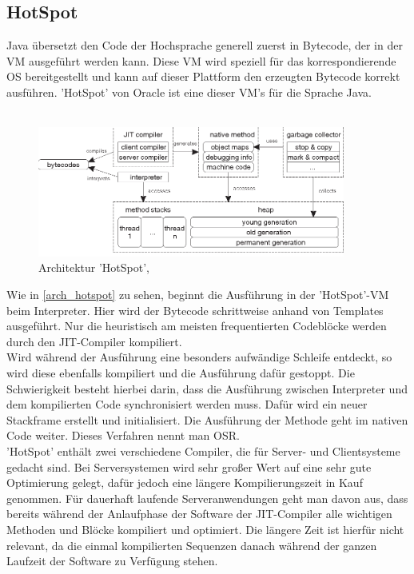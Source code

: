 \subsection{HotSpot}
Java übersetzt den Code der Hochsprache generell zuerst in Bytecode, der in der \ac{VM} ausgeführt werden kann. Diese \ac{VM} wird speziell für das korrespondierende \ac{OS} bereitgestellt und kann auf dieser Plattform den erzeugten Bytecode korrekt ausführen. 'HotSpot' von Oracle ist eine dieser \ac{VM}'s für die Sprache Java. \\
\\
\begin{figure}[ht]
    \begin{center}
        \includegraphics[width=0.9\textwidth]{assets/img/3-Figure1-1.png}
        \caption{Architektur 'HotSpot', \cite[Quelle: Kotzmann Wimmer 2008]{KotzmannWimmer2008}}
        \label{arch_hotspot}
    \end{center}
\end{figure}
Wie in \autoref{arch_hotspot} zu sehen, beginnt die Ausführung in der 'HotSpot'-\ac{VM} beim Interpreter. Hier wird der Bytecode schrittweise anhand von Templates ausgeführt. Nur die heuristisch am meisten frequentierten Codeblöcke werden durch den \ac{JIT}-Compiler kompiliert.\\
Wird während der Ausführung eine besonders aufwändige Schleife entdeckt, so wird diese ebenfalls kompiliert und die Ausführung dafür gestoppt. Die Schwierigkeit besteht hierbei darin, dass die Ausführung zwischen Interpreter und dem kompilierten Code synchronisiert werden muss. Dafür wird ein neuer Stackframe erstellt und initialisiert. Die Ausführung der Methode geht im nativen Code weiter. Dieses Verfahren nennt man \ac{OSR}.\\
'HotSpot' enthält zwei verschiedene Compiler, die für Server- und Clientsysteme gedacht sind. Bei Serversystemen wird sehr großer Wert auf eine sehr gute Optimierung gelegt, dafür jedoch eine längere Kompilierungszeit in Kauf genommen. Für dauerhaft laufende Serveranwendungen geht man davon aus, dass bereits während der Anlaufphase der Software der \ac{JIT}-Compiler alle wichtigen Methoden und Blöcke kompiliert und optimiert. Die längere Zeit ist hierfür nicht relevant, da die einmal kompilierten Sequenzen danach während der ganzen Laufzeit der Software zu Verfügung stehen.\\
